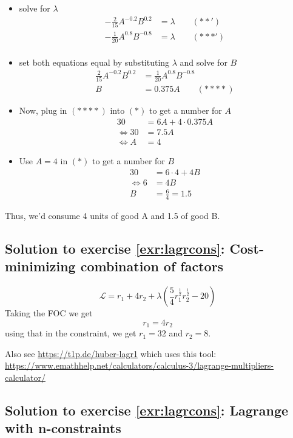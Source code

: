 \documentclass[
  12pt,
  oneside]{book}
\providecommand{\tightlist}{%
  \setlength{\itemsep}{0pt}\setlength{\parskip}{0pt}}
\theoremstyle{definition}
\theoremstyle{definition}
\theoremstyle{definition}
\theoremstyle{definition}
\theoremstyle{remark}
\begin{document}
\begin{itemize}
\tightlist
\item
  solve for \(\lambda\)
  \begin{align*}
    -\frac{2}{15} A^{-0.2}B^{0.2}&=\lambda \qquad (**')\\
        -\frac{1}{20} A^{0.8}B^{-0.8}&=\lambda \qquad (***')\\
  \end{align*}
\item
  set both equations equal by substituting \(\lambda\) and solve for \(B\)
  \begin{align*}
    \frac{2}{15} A^{-0.2}B^{0.2}&=  \frac{1}{20} A^{0.8}B^{-0.8}\\
    B&=0.375A \qquad (****) %
  \end{align*}
\item
  Now, plug in \((****)\) into \((*)\) to get a number for \(A\)
  \begin{align*}
    30&=6A+4\cdot 0.375 A\\
    \Leftrightarrow 30&=7.5A\\
    \Leftrightarrow A&=4
  \end{align*}
\item
  Use \(A=4\) in \((*)\) to get a number for \(B\)
  \begin{align*}
    30&=6\cdot 4+4 B\\
    \Leftrightarrow 6&=4B\\
    B&=\frac{6}{4}=1.5
  \end{align*}
\end{itemize}

Thus, we'd consume 4 units of good A and 1.5 of good B.

\subsection*{Solution to exercise \ref{exr:lagrcons}: Cost-minimizing combination of factors}\label{sol:costmin}

\[
\mathcal{L}=r_1+4r_2+\lambda\left(\frac{5}{4}r_1^{\frac{1}{2}}r_2^{\frac{1}{2}}-20\right)
\]
Taking the FOC we get
\[r_1=4r_2\] using that in the constraint, we get \(r_1=32\) and \(r_2=8\).

Also see \url{https://t1p.de/huber-lagr1} which uses this tool: \url{https://www.emathhelp.net/calculators/calculus-3/lagrange-multipliers-calculator/}

\subsection*{Solution to exercise \ref{exr:lagrcons}: Lagrange with n-constraints}\label{sol:lagrcons}
\end{document}
